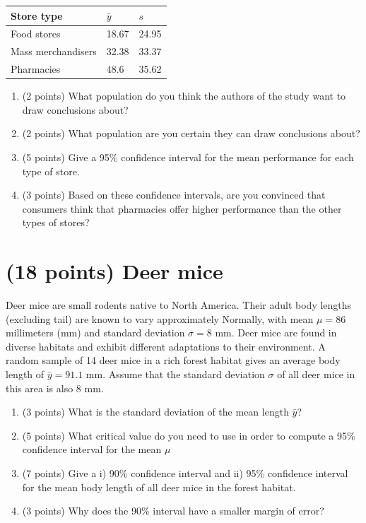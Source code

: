 \documentclass[letterpaper,12pt,twoside,]{pinp}
\providecommand{\tightlist}{%
  \setlength{\itemsep}{0pt}\setlength{\parskip}{0pt}}
\begin{document}
\begin{longtable}[]{@{}lll@{}}
\toprule
Store type & \(\bar{y}\) & \(s\)\tabularnewline
\midrule
\endhead
Food stores & 18.67 & 24.95\tabularnewline
Mass merchandisers & 32.38 & 33.37\tabularnewline
Pharmacies & 48.6 & 35.62\tabularnewline
\bottomrule
\end{longtable}

\begin{enumerate}
\def\labelenumi{\alph{enumi}.}
\tightlist
\item
  (2 points) What population do you think the authors of the study want
  to draw conclusions about?
\item
  (2 points) What population are you certain they can draw conclusions
  about?
\item
  (5 points) Give a 95\% confidence interval for the mean performance
  for each type of store.
\item
  (3 points) Based on these confidence intervals, are you convinced that
  consumers think that pharmacies offer higher performance than the
  other types of stores?
\end{enumerate}

\hypertarget{points-deer-mice}{%
\section{(18 points) Deer mice}\label{points-deer-mice}}

Deer mice are small rodents native to North America. Their adult body
lengths (excluding tail) are known to vary approximately Normally, with
mean \(\mu = 86\) millimeters (mm) and standard deviation \(\sigma=8\)
mm. Deer mice are found in diverse habitats and exhibit different
adaptations to their environment. A random sample of 14 deer mice in a
rich forest habitat gives an average body length of \(\bar{y} = 91.1\)
mm. Assume that the standard deviation \(\sigma\) of all deer mice in
this area is also 8 mm.

\begin{enumerate}
\def\labelenumi{\alph{enumi}.}
\tightlist
\item
  (3 points) What is the standard deviation of the mean length
  \(\bar{y}\)?
\item
  (5 points) What critical value do you need to use in order to compute
  a 95\% confidence interval for the mean \(\mu\)
\item
  (7 points) Give a i) 90\% confidence interval and ii) 95\% confidence
  interval for the mean body length of all deer mice in the forest
  habitat.
\item
  (3 points) Why does the 90\% interval have a smaller margin of error?
\end{enumerate}
\end{document}
